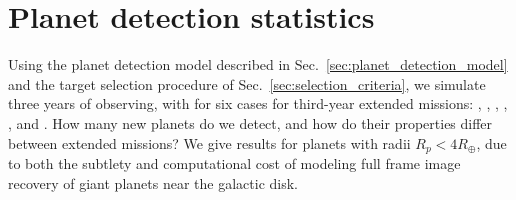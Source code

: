 \section{Planet detection statistics}  
\label{sec:newly_detected_planet_metrics}

Using the planet detection model described in Sec.~\ref{sec:planet_detection_model} and the target selection procedure of Sec.~\ref{sec:selection_criteria}, we simulate three years of \tess observing, with for six cases for third-year extended missions: \nhemi, \npole, \shemiAvoid, \elong, \eshort, and \hemis.
How many new planets do we detect, and how do their properties differ between extended missions?
We give results for planets with radii $R_p < 4R_\oplus$, due to both the subtlety and computational cost of modeling full frame image recovery of giant planets near the galactic disk.







